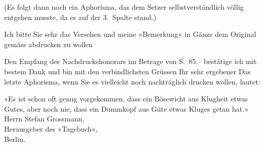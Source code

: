 \pstart
           (Es folgt dann noch ein Aphorisma, das dem Setzer selbstverständlich völlig entgehen
               musste, da es auf der 3. Spalte stand.)\pend
           
\pstart
           Ich bitte Sie sehr das Versehen \label{K_L02476-1v}\label{K_L02476-1} und meine »Bemerkung« in Gänze dem Original gemäss abdrucken zu
               wollen\pend
           
\pstart
           Den Empfang des Nachdruckshonorars im Betrage von S. 85.– bestätige ich mit bestem
               Dank und bin mit den verbindlichsten Grüssen\pend
           \pstart Ihr sehr ergebener\pend{}{\vspace{1\baselineskip}}
\pstart
           Das letzte Aphorisma, wenn Sie es vielleicht noch nachträglich drucken wollen,
                  lautet:\pend
           
\pstart
           »Es ist schon oft genug vorgekommen, dass ein Bösewicht aus Klugheit etwas Gutes,
                  aber noch nie, dass ein Dummkopf aus Güte etwas Kluges getan hat.«\pend
           {\vspace{1\baselineskip}}
\pstart
           Herrn Stefan Grossmann,{\\}Herausgeber des »Tagebuch«,{\\}Berlin.\pend
           \endnumbering{}  \newcommand{\dateiname}{L02476}\newcommand{\titel}{Arthur Schnitzler an Stefan Großmann, 31. 5. 1926}\newcommand{\editorInnen}{Martin Anton Müller und Gerd-Hermann Susen}
